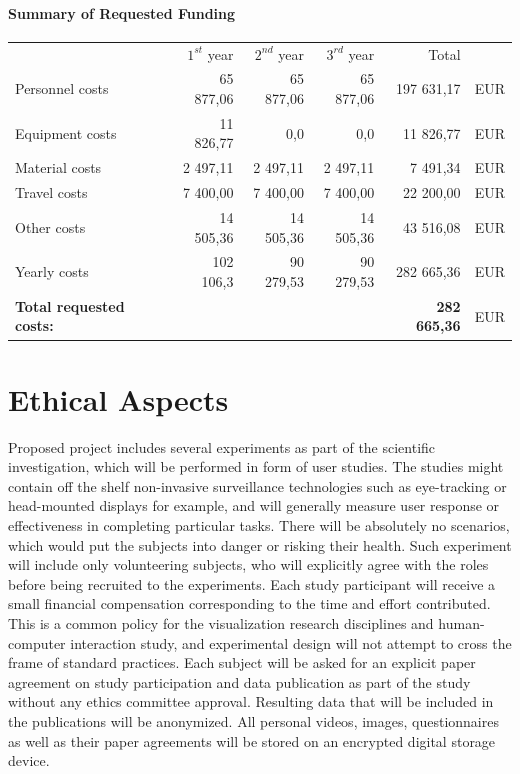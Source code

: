 \documentclass[11pt,a4paper,titlepage,oneside,onecolumn]{article}
\begin{document}
\paragraph{Summary of Requested Funding}
\begin{center}
\begin{tabular}{lrrrrl}
                        & $1^{st}$ year  &  $2^{nd}$ year & $3^{rd}$ year & Total & \\
Personnel costs   &  65 877,06 & 65 877,06 & 65 877,06  & 197 631,17 & EUR \\
Equipment costs   &  11 826,77 &  0,0 &  0,0 &  11 826,77 & EUR \\
Material costs    &  2 497,11  &  2 497,11  &  2 497,11  &  7 491,34 & EUR \\
Travel costs      &  7 400,00  & 7 400,00   & 7 400,00  &  22 200,00 & EUR \\
Other costs       &  14	505,36  & 14 505,36  & 14	505,36  &  43 516,08 & EUR \\
Yearly costs      & 102 106,3 & 90 279,53 & 90 279,53  & 282 665,36 & EUR \\
\hline
\textbf{Total requested costs:}    &   & & & \textbf{282 665,36} & EUR \\
\end{tabular}
\end{center}

\section{Ethical Aspects}
Proposed project includes several experiments as part of the scientific investigation, which will be performed in form of user studies. The studies might contain off the shelf non-invasive surveillance technologies such as eye-tracking or head-mounted displays for example, and will generally measure user response or effectiveness in completing particular tasks. There will be absolutely no scenarios, which would put the subjects into danger or risking their health. Such experiment will include only volunteering subjects, who will explicitly agree with the roles before being recruited to the experiments. Each study participant will receive a small financial compensation corresponding to the time and effort contributed. This is a common policy for the visualization research disciplines and human-computer interaction study, and experimental design will not attempt to cross the frame of standard practices. Each subject will be asked for an explicit paper agreement on study participation and data publication as part of the study without any ethics committee approval. Resulting data that will be included in the publications will be anonymized. All personal videos, images, questionnaires as well as their paper agreements will be stored on an encrypted digital storage device.

\newpage
{}
\linespread{1.0}
\begin{small}


\end{small}
\end{document}
